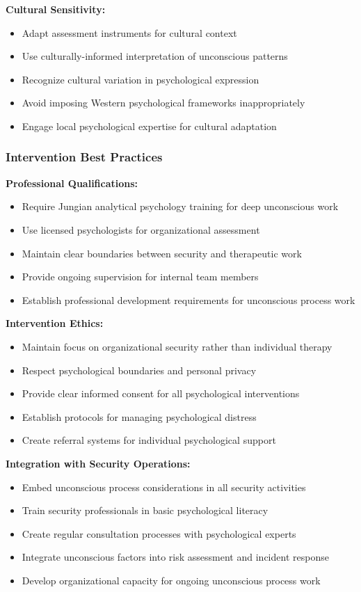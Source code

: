 \documentclass[11pt,a4paper]{article}
\begin{document}
\textbf{Cultural Sensitivity:}
\begin{itemize}
\item Adapt assessment instruments for cultural context
\item Use culturally-informed interpretation of unconscious patterns
\item Recognize cultural variation in psychological expression
\item Avoid imposing Western psychological frameworks inappropriately
\item Engage local psychological expertise for cultural adaptation
\end{itemize}

\subsubsection{Intervention Best Practices}

\textbf{Professional Qualifications:}
\begin{itemize}
\item Require Jungian analytical psychology training for deep unconscious work
\item Use licensed psychologists for organizational assessment
\item Maintain clear boundaries between security and therapeutic work
\item Provide ongoing supervision for internal team members
\item Establish professional development requirements for unconscious process work
\end{itemize}

\textbf{Intervention Ethics:}
\begin{itemize}
\item Maintain focus on organizational security rather than individual therapy
\item Respect psychological boundaries and personal privacy
\item Provide clear informed consent for all psychological interventions
\item Establish protocols for managing psychological distress
\item Create referral systems for individual psychological support
\end{itemize}

\textbf{Integration with Security Operations:}
\begin{itemize}
\item Embed unconscious process considerations in all security activities
\item Train security professionals in basic psychological literacy
\item Create regular consultation processes with psychological experts
\item Integrate unconscious factors into risk assessment and incident response
\item Develop organizational capacity for ongoing unconscious process work
\end{itemize}
\end{document}
